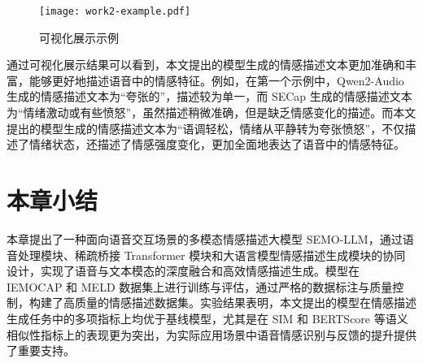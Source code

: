 \begin{figure}[ht]
  \centering
  \texttt{[image: work2-example.pdf]}
  \caption{可视化展示示例}
  \label{fig:work2-example}
\end{figure}

通过可视化展示结果可以看到，本文提出的模型生成的情感描述文本更加准确和丰富，能够更好地描述语音中的情感特征。例如，在第一个示例中，Qwen2-Audio 生成的情感描述文本为“夸张的”，描述较为单一，而 SECap 生成的情感描述文本为“情绪激动或有些愤怒”，虽然描述稍微准确，但是缺乏情感变化的描述。而本文提出的模型生成的情感描述文本为“语调轻松，情绪从平静转为夸张愤怒”，不仅描述了情绪状态，还描述了情感强度变化，更加全面地表达了语音中的情感特征。

\section{本章小结}

本章提出了一种面向语音交互场景的多模态情感描述大模型 SEMO-LLM，通过语音处理模块、稀疏桥接 Transformer 模块和大语言模型情感描述生成模块的协同设计，实现了语音与文本模态的深度融合和高效情感描述生成。模型在 IEMOCAP 和 MELD 数据集上进行训练与评估，通过严格的数据标注与质量控制，构建了高质量的情感描述数据集。实验结果表明，本文提出的模型在情感描述生成任务中的多项指标上均优于基线模型，尤其是在 SIM 和 BERTScore 等语义相似性指标上的表现更为突出，为实际应用场景中语音情感识别与反馈的提升提供了重要支持。
